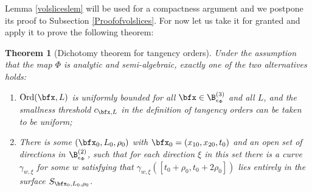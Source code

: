 \documentclass{article}
\numberwithin{equation}{section}
\theoremstyle{plain}
\newtheorem{theorem}{Theorem}[section]
\begin{document}
Lemma \ref{volsliceslem} will be used for a compactness argument and we postpone its proof to Subsection \ref{Proofofvolslices}. For now let us take it for granted and apply it to prove the following theorem:

\begin{theorem}[Dichotomy theorem for tangency orders]\label{Dichotomythm}
Under the assumption that the map $\Phi$ is analytic and semi-algebraic, 
    exactly one of the two alternatives holds: 
    \begin{enumerate}
        \item[(i)]  $\mathrm{Ord}(\bfx, L)$  is uniformly bounded for all $\bfx\in \B^{(3)}_{\epsilon_{\Phi}}$ and all $L$, and the smallness threshold $c_{\bfx, L}$ in the definition of tangency orders can be taken to be uniform; 
        \item[(ii)] 
        There is some $(\bfx_0, L_0, \rho_0)$ with $\bfx_0 = (x_{10}, x_{20}, t_0)$ and an open set of directions in $\B^{(2)}_{\epsilon_{\Phi}}$, such that for each direction $\xi$ in this set there is a curve $\gamma_{w, \xi}$ for some $w$ satisfying that  $\gamma_{w, \xi}([t_0+\rho_0, t_0+2\rho_0])$ lies entirely in the surface $S_{\bfx_0, L_0, \rho_0}$.%
    \end{enumerate}
\end{theorem}
\end{document}

